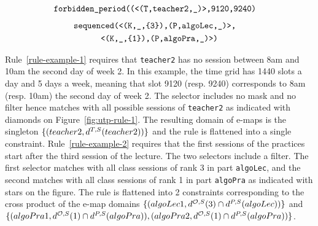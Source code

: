 {\footnotesize{
\begin{multline}
\texttt{\mbox{\hspace*{-1em}}{forbidden\_period}((<(T,{teacher2},\_)>,9120,9240)}\label{rule-example-1}\\
\end{multline}
\begin{multline}
\texttt{\mbox{\hspace*{-1em}}{sequenced}(<(K,\_,\{3\}),(P,{algoLec},\_)>,}\\
\texttt{<(K,\_,\{1\}),(P,{algoPra},\_)>)\label{rule-example-2}}
\end{multline}
}}

Rule~\ref{rule-example-1}
requires that \texttt{teacher2} has no session between 8am and 10am the second day of week 2.
In this example, the time grid has 1440 slots a day and 5 days a week, meaning that slot %
9120 (resp. 9240) corresponds to 8am (resp. 10am) the second day of week 2.
The selector includes no mask and no filter hence matches with all possible sessions of \texttt{teacher2} 
as indicated with diamonds on Figure~\ref{fig:utp-rule-1}. 
The resulting domain of e-maps is the singleton $\{(teacher2,d^{T,S}(teacher2))\}$
and the rule is flattened into a single \texttt{\FORBIDDENPERIOD} constraint. %
Rule~\ref{rule-example-2}
requires that the first sessions of the practices start after the third session of the lecture.
The two selectors include a filter. The first selector matches with all class sessions of rank 3 in part \texttt{algoLec}, 
and the second matches with all class sessions of rank 1 in part \texttt{algoPra} as indicated with stars on the figure.
The rule is flattened into 2 \texttt{\SEQUENCED} constraints corresponding to the cross product of the e-map domains $\{(algoLec1,d^{\mathcal{O},S}(3)\cap d^{P,S}(algoLec))\}$
and $\{(algoPra1,d^{\mathcal{O},S}(1)\cap d^{P,S}(algoPra)),(algoPra2,d^{\mathcal{O},S}(1)\cap d^{P,S}(algoPra))\}$.
